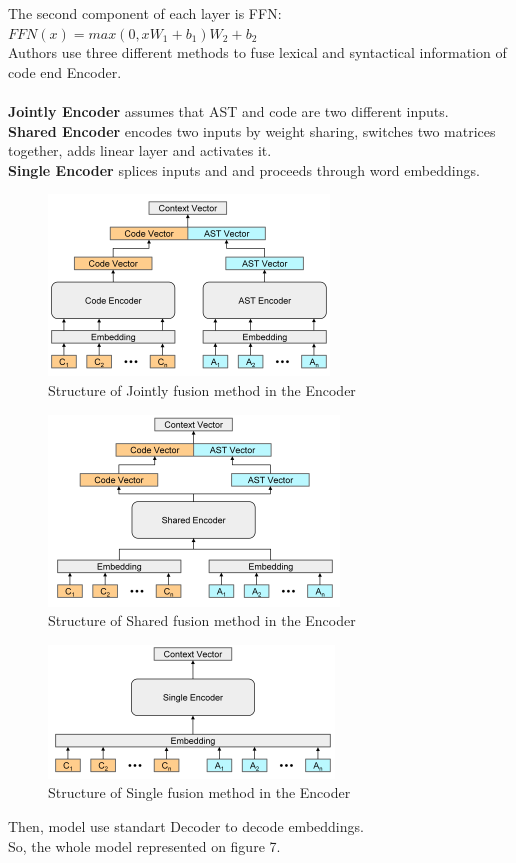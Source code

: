 \documentclass{article}
\begin{document}
The second component of each layer is FFN:\\ $FFN(x) = max(0, xW_1 + b_1)W_2+b_2$\\
Authors use three different methods to fuse lexical and syntactical information of code end Encoder.\\\\
\textbf{Jointly Encoder} assumes that AST and code are two different inputs.\\
\textbf{Shared Encoder} encodes two inputs by weight sharing, switches two matrices together, adds linear layer and activates it.\\
\textbf{Single Encoder} splices inputs and and proceeds through word embeddings.

\begin{figure}[!tbh]
    \centering
    \includegraphics[width=0.6\linewidth]{jointly.png}
    \caption{Structure of Jointly fusion method in the Encoder}
    \label{fig:jointly}
\end{figure}
\begin{figure}[!tbh]
    \centering
    \includegraphics[width=0.6\linewidth]{shared.png}
    \caption{Structure of Shared fusion method in the Encoder}
    \label{fig:shared}
\end{figure}
\begin{figure}[!tbh]
    \centering
    \includegraphics[width=0.6\linewidth]{single.png}
    \caption{Structure of Single fusion method in the Encoder}
    \label{fig:single}
\end{figure}
Then, model use standart Decoder to decode embeddings.\\
So, the whole model represented on figure 7.
\end{document}
